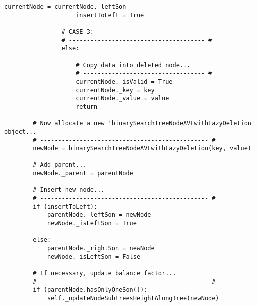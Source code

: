 \documentclass[10pt,a4paper,titlepage]{article}
\begin{document}
\begin{lstlisting}[frame=lines]
                    currentNode = currentNode._leftSon
                    insertToLeft = True
                        
                # CASE 3:
                # -------------------------------------- #
                else:
                        
                    # Copy data into deleted node...
                    # ---------------------------------- #
                    currentNode._isValid = True
                    currentNode._key = key
                    currentNode._value = value
                    return
              
        # Now allocate a new 'binarySearchTreeNodeAVLwithLazyDeletion' object...
        # ----------------------------------------------- #
        newNode = binarySearchTreeNodeAVLwithLazyDeletion(key, value) 
            
        # Add parent...
        newNode._parent = parentNode 
                          
        # Insert new node...
        # ----------------------------------------------- #
        if (insertToLeft):      
            parentNode._leftSon = newNode
            newNode._isLeftSon = True
                
        else:
            parentNode._rightSon = newNode
            newNode._isLeftSon = False
                
        # If necessary, update balance factor...
        # ----------------------------------------------- #
        if (parentNode.hasOnlyOneSon()):
            self._updateNodeSubtreesHeightAlongTree(newNode)
\end{lstlisting}
\end{document}
